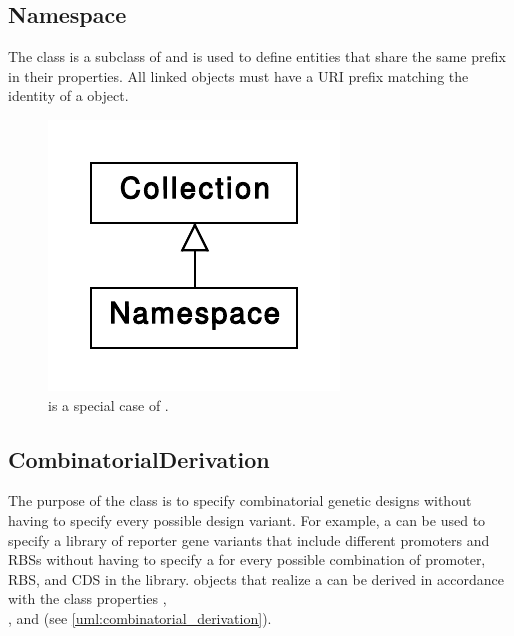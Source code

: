 \subsection{Namespace}
\label{sec:Namespace}
The  class is a subclass of  and is used to define  entities that share the same prefix in their  properties. All linked objects must have a URI prefix matching the identity of a  object. 

\begin{figure}[ht]
\begin{center}
\includegraphics[scale=0.6]{uml/namespace}
\caption[]{ is a special case of .}
\label{uml:namespace}
\end{center}
\end{figure}

\subsection{CombinatorialDerivation}
\label{sec:CombinatorialDerivation}

The purpose of the  class is to specify combinatorial genetic designs without having to specify every possible design variant. For example, a  can be used to specify a library of reporter gene variants that include different promoters and RBSs without having to specify a  for every possible combination of promoter, RBS, and CDS in the library.  objects that realize a  can be derived in accordance with the class properties , \\
, and  (see \ref{uml:combinatorial_derivation}).


